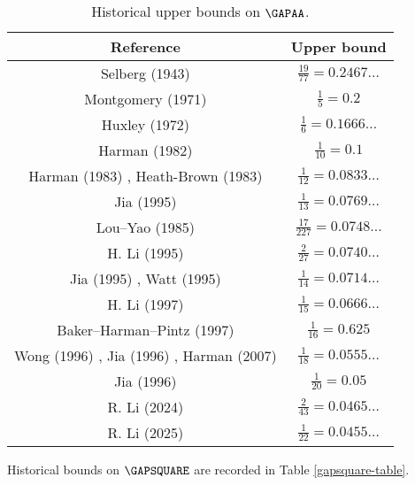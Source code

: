\begin{table}[ht]
    \caption{Historical upper bounds on $\GAPAA$.}
    \centering
    \renewcommand{\arraystretch}{1.2}
    \begin{tabular}{|c|c|}
    \hline
    Reference & Upper bound \\
    \hline
    Selberg (1943) \cite{selberg_1943} & $\frac{19}{77}=0.2467\dots$\\
    \hline
    Montgomery (1971) \cite{montgomery_topics_1971} & $\frac{1}{5}=0.2$ \\
    \hline
    Huxley (1972) \cite{Huxley} & $\frac{1}{6} = 0.1666\dots$ \\
    \hline
    Harman (1982) \cite{harman_1982} & $\frac{1}{10} = 0.1$ \\
    \hline
    Harman (1983) \cite{harman_1983}, Heath-Brown (1983) \cite{heathbrown_sieve_1984}  & $\frac{1}{12} = 0.0833\dots$ \\
    \hline
    Jia (1995) \cite{jia_goldbach_1994} & $\frac{1}{13} = 0.0769\dots$ \\
    \hline
    Lou--Yao (1985) \cite{lou_yao_1985} & $\frac{17}{227}= 0.0748\dots$ \\
    \hline
    H. Li (1995) \cite{li_goldbach_1995} & $\frac{2}{27} = 0.0740\dots$ \\
    \hline
    Jia (1995) \cite{jia_difference_1995}, Watt (1995) \cite{watt_short_1995} & $\frac{1}{14}=0.0714\dots$ \\
    \hline
    H. Li (1997) \cite{li_short_1997} & $\frac{1}{15}=0.0666\dots$ \\
    \hline
    Baker--Harman--Pintz (1997) \cite{baker-harman-pintz_goldbach_1997} & $\frac{1}{16} = 0.625$ \\
    \hline
    Wong (1996) \cite{wong_thesis_1996}, Jia (1996) \cite{jia_exceptional_1996}, Harman (2007) \cite{harman-book} & $\frac{1}{18} = 0.0555\dots$ \\
    \hline
    Jia (1996) \cite{jia_almost_all} & $\frac{1}{20} = 0.05$ \\
    \hline
    R. Li (2024) \cite{li_primes_almost_2024} & $\frac{2}{43} = 0.0465\dots$ \\
    \hline
    R. Li (2025) \cite{li_primes_almost_II_2025} & $\frac{1}{22} = 0.0455\dots$ \\
    \hline
    \end{tabular}
    \end{table}\label{gapaa-table}

    Historical bounds on $\GAPSQUARE$ are recorded in Table \ref{gapsquare-table}.

